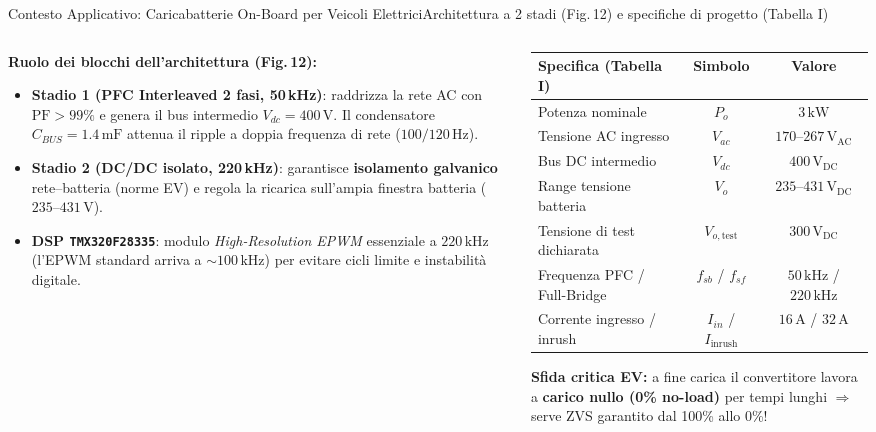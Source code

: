 \documentclass[aspectratio=169,9pt]{beamer}
\newcommand{\V}{\,\text{V}}
\newcommand{\A}{\,\text{A}}
\newcommand{\kW}{\,\text{kW}}
\newcommand{\kHz}{\,\text{kHz}}
\newcommand{\mF}{\,\text{mF}}
\begin{document}
\begin{frame}{Contesto Applicativo: Caricabatterie On-Board per Veicoli Elettrici}{Architettura a 2 stadi (Fig.\,12) e specifiche di progetto (Tabella I)}
  \vspace*{2mm}
  \begin{columns}[T,onlytextwidth]
    \begin{column}{0.52\textwidth}
      \scriptsize
      \textbf{\color{PrimaryBlue}Ruolo dei blocchi dell'architettura (Fig.\,12):}
      \begin{itemize}\setlength{\itemsep}{2pt}
        \item \textbf{Stadio 1 (PFC Interleaved 2 fasi, 50\,kHz)}: raddrizza la rete AC con $\text{PF}>99\%$ e genera il bus intermedio $V_{dc}=400\V$. Il condensatore $C_{BUS}=1.4\mF$ attenua il ripple a doppia frequenza di rete ($100/120\,\text{Hz}$).
        \item \textbf{Stadio 2 (DC/DC isolato, 220\,kHz)}: garantisce \textbf{isolamento galvanico} rete--batteria (norme EV) e regola la ricarica sull'ampia finestra batteria ($235\text{--}431\V$).
        \item \textbf{DSP \texttt{TMX320F28335}}: modulo \emph{High-Resolution EPWM} essenziale a $220\kHz$ (l'EPWM standard arriva a $\sim 100\kHz$) per evitare cicli limite e instabilit\`a digitale.
      \end{itemize}
    \end{column}
    \begin{column}{0.45\textwidth}
      \scriptsize
      \centering
      \setlength{\tabcolsep}{4pt}
      \begin{tabular}{@{}lcc@{}}
        \toprule
        \textbf{Specifica (Tabella I)} & \textbf{Simbolo} & \textbf{Valore} \\
        \midrule
        Potenza nominale & $P_o$ & $3\kW$ \\
        Tensione AC ingresso & $V_{ac}$ & $170\text{--}267\V_{\text{AC}}$ \\
        Bus DC intermedio & $V_{dc}$ & $400\V_{\text{DC}}$ \\
        Range tensione batteria & $V_o$ & $235\text{--}431\V_{\text{DC}}$ \\
        Tensione di test dichiarata & $V_{o,\text{test}}$ & $300\V_{\text{DC}}$ \\
        Frequenza PFC / Full-Bridge & $f_{sb}$ / $f_{sf}$ & $50\kHz$ / $220\kHz$ \\
        Corrente ingresso / inrush & $I_{in}$ / $I_{\text{inrush}}$ & $16\A$ / $32\A$ \\
        \bottomrule
      \end{tabular}
      \vspace*{1.5mm}
      \begin{warnbox}
        \textbf{Sfida critica EV:} a fine carica il convertitore lavora a \textbf{carico nullo (0\% no-load)} per tempi lunghi $\Rightarrow$ serve ZVS garantito dal 100\% allo 0\%!
      \end{warnbox}
    \end{column}
  \end{columns}
\end{frame}
\end{document}
